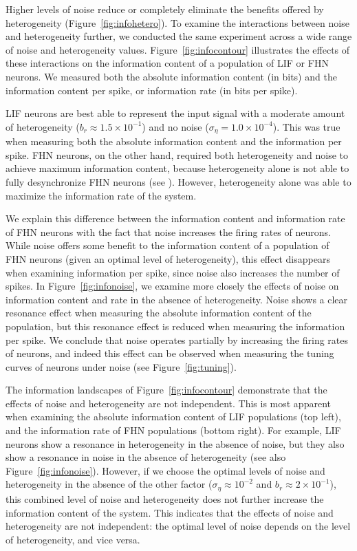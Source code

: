 \documentclass[12pt]{article}
\begin{document}
Higher levels of noise reduce or completely eliminate the benefits offered by heterogeneity (Figure~\ref{fig:infohetero}). To examine the interactions between noise and heterogeneity further, we conducted the same experiment across a wide range of noise and heterogeneity values. Figure~\ref{fig:infocontour} illustrates the effects of these interactions on the information content of a population of LIF or FHN neurons. We measured both the absolute information content (in bits) and the information content per spike, or information rate (in bits per spike).

LIF neurons are best able to represent the input signal
with a moderate amount of heterogeneity ($b_r \approx 1.5 \times 10^{-1}$)
and no noise ($\sigma_\eta = 1.0 \times 10^{-4}$).
This was true when measuring both the absolute information content and the information per spike.
FHN neurons, on the other hand, required both heterogeneity and noise
to achieve maximum information content,
because heterogeneity alone is not able to fully desynchronize FHN neurons (see \textsc{}).
However, heterogeneity alone was able to maximize the information rate of the system.

We explain this difference between the information content and information rate of FHN neurons
with the fact that noise increases the firing rates of neurons.
While noise offers some benefit to the information content of a population of FHN neurons
(given an optimal level of heterogeneity),
this effect disappears when examining information per spike,
since noise also increases the number of spikes.
In Figure~\ref{fig:infonoise}, we examine more closely the effects of noise on information content and rate in the absence of heterogeneity. Noise shows a clear resonance effect when measuring the absolute information content of the population, but this resonance effect is reduced when measuring the information per spike. We conclude that noise operates partially by increasing the firing rates of neurons, and indeed this effect can be observed when measuring the tuning curves of neurons under noise (see Figure~\ref{fig:tuning}).

The information landscapes of Figure~\ref{fig:infocontour} demonstrate that the effects of noise and heterogeneity are not independent. This is most apparent when examining the absolute information content of LIF populations (top left), and the information rate of FHN populations (bottom right).
For example, LIF neurons show a resonance in heterogeneity in the absence of noise,
but they also show a resonance in noise in the absence of heterogeneity (see also Figure~\ref{fig:infonoise}).
However, if we choose the optimal levels of noise and heterogeneity in the absence of the other factor ($\sigma_\eta \approx 10^{-2}$ and $b_r \approx 2 \times 10^{-1}$), this combined level of noise and heterogeneity does not further increase the information content of the system. This indicates that the effects of noise and heterogeneity are not independent: the optimal level of noise depends on the level of heterogeneity, and vice versa.
\end{document}

